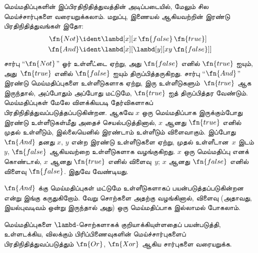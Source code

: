 \documentclass[../../../include/open-logic-section]{subfiles}
\begin{document}
மெய்மதிப்புகளின் இப்பிரதிநிதித்துவத்தின் அடிப்படையில், மேலும் சில
மெய்ச்சார்புகளை வரையறுக்கலாம். மறுப்பு, இணையல் ஆகியவற்றின் இரண்டு
பிரதிநிதித்துவங்கள் இதோ:
\begin{align*}
  \fn{Not} & \ident \lambd[x][x\, \fn{false}\, \fn{true}]\\
  \fn{And} & \ident \lambd[x][\lambd[y][xy \,\fn{false}]]
\end{align*}
சார்பு “$\fn{Not}$” ஓர் உள்ளீட்டை ஏற்று, அது $\fn{false}$ எனில்
$\fn{true}$ ஐயும், அது~$\fn{true}$ எனில் $\fn{false}$ ஐயும்
திருப்பித்தருகிறது. சார்பு “$\fn{And}$” இரண்டு மெய்மதிப்புகளை உள்ளீடுகளாக
ஏற்று, இரு உள்ளீடுகளும்~$\fn{true}$ ஆக இருந்தால், அப்போதும் அப்போது மட்டுமே,
$\fn{true}$ ஐத் திருப்பித்தர வேண்டும். மெய்மதிப்புகள் மேலே விளக்கியபடி
தேர்விகளாகப் பிரதிநிதித்துவப்படுத்தப்படுகின்றன. ஆகவே $x$ ஒரு மெய்மதிப்பாக
இருக்கும்போது இரண்டு உள்ளீடுகள்மீது அதைச் செயல்படுத்தினால், $x$ ஆனது
$\fn{true}$ எனில் முதல் உள்ளீடும், இல்லையெனில் இரண்டாம் உள்ளீடும் விளைவாகும்.
இப்போது $\fn{And}$ தனது $x$, $y$ என்ற இரண்டு உள்ளீடுகளை ஏற்று, முதல்
உள்ளீடான~$x$ இடம் $y$, $\fn{false}$ ஆகியவற்றை உள்ளீடுகளாக வழங்குகிறது.
$x$ ஒரு மெய்மதிப்பு எனக் கொண்டால், $x$ ஆனது $\fn{true}$ எனில் விளைவு~$y$;
$x$ ஆனது $\fn{false}$ எனில் விளைவு $\fn{false}$. இதுவே வேண்டியது.

$\fn{And}$ க்கு மெய்மதிப்புகள் மட்டுமே உள்ளீடுகளாகப் பயன்படுத்தப்படுகின்றன
என்று இங்கு கருதுகிறோம். வேறு சொற்களை அதற்கு வழங்கினால், விளைவு (அதாவது,
இயல்புவடிவம் ஒன்று இருந்தால் அது) ஒரு மெய்மதிப்பாக இல்லாமல் போகலாம்.

\begin{prob}
  மெய்மதிப்புகளை $\lambd$-சொற்களாகக் குறியாக்கியுள்ளதைப் பயன்படுத்தி,
  உள்ளடக்கிய, விலக்கும் பிரிப்பிணைவுகளின் மெய்ச்சார்புகளைப் பிரதிநிதித்துவப்படுத்தும்
  $\fn{Or}$, $\fn{Xor}$ ஆகிய சார்புகளை வரையறுக்க.
\end{prob}
\end{document}
